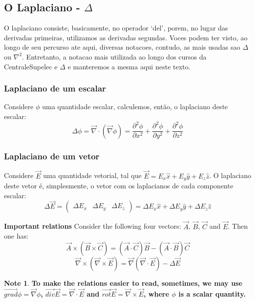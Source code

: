 \documentclass[11pt]{article}
\theoremstyle{definition}
\newtheorem{note}{Note}
\begin{document}
\subsection{O Laplaciano - $\Delta$}
O laplaciano consiste, basicamente, no operador `del', porem, no lugar das derivadas primeiras, utilizamos as derivadas segundas.
Voces podem ter visto, ao longo de seu percurso ate aqui, diversas notacoes, contudo, as mais usadas sao $\Delta$ ou $\nabla ^2$. Entretanto,
a notacao mais utilizada ao longo dos cursos da CentraleSupelec e $\Delta$ e manteremos a mesma aqui neste texto.
\subsubsection{Laplaciano de um escalar}
Considere $\phi$ uma quantidade escalar, calculemos, então, o laplaciano deste escalar:
\begin{equation}
    \Delta \phi = \vec{\nabla} \cdot \left(\vec{\nabla} \phi\right)
                = \frac{\partial^2 \phi}{\partial x^2}+\frac{\partial^2 \phi}{\partial y^2}+\frac{\partial^2 \phi}{\partial z^2}
\end{equation}
\subsubsection{Laplaciano de um vetor}
Considere $\vec{E}$ uma quantidade vetorial, tal que $\vec{E} = E_{x}\hat{x}+E_{y}\hat{y}+E_{z}\hat{z}$. O laplaciano deste vetor é, simplesmente, o vetor com os laplacianos de cada componente escalar:
\begin{equation}
    \Delta \vec{E} = \left(\begin{matrix}
                        \Delta E_{x} & \Delta E_{y} & \Delta E_{z}
                     \end{matrix}\right) = \Delta E_{x}\hat{x} + \Delta E_{y}\hat{y} + \Delta E_{z}\hat{z}
\end{equation}
\begin{shaded}
\textbf{Important relations}\newline
Consider the following four vectors: $\vec{A}$, $\vec{B}$, $\vec{C}$ and $\vec{E}$. Then one has:
\begin{equation}
\vec{A} \times \left(\vec{B} \times \vec{C}\right) = \left(\vec{A} \cdot \vec{C}\right)\vec{B} - \left(\vec{A} \cdot \vec{B}\right)\vec{C}
\end{equation}
\begin{equation}
\vec{\nabla} \times \left(\vec{\nabla} \times \vec{E}\right) = \vec{\nabla}\left(\vec{\nabla} \cdot \vec{E}\right) - \Delta \vec{E}
\end{equation}
\begin{note}
\textbf{To make the relations easier to read, sometimes, we may use $\vec{grad} \phi = \vec{\nabla}\phi$, $\vec{div} \vec{E}= \vec{\nabla} \cdot \vec{E}$ and $\vec{rot} \vec{E}= \vec{\nabla} \times \vec{E}$, where $\phi$ is a scalar quantity.}
\end{note}
\end{shaded}
\end{document}
